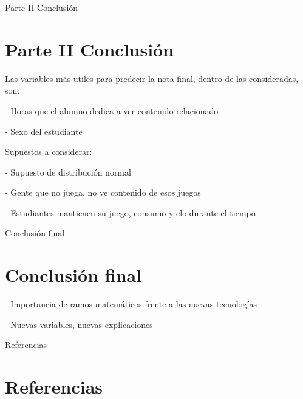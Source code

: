 \documentclass[pdf]{beamer}
\begin{document}
\begin{frame}{Parte II Conclusión}
\section{Parte II Conclusión}
\begin{footnotesize}
            
Las variables más utiles para predecir la nota final, dentro de las consideradas, son:

- Horas que el alumno dedica a ver contenido relacionado
            
- Sexo del estudiante

            
Supuestos a considerar:

- Supuesto de distribución normal

- Gente que no juega, no ve contenido de esos juegos

- Estudiantes mantienen su juego, consumo y elo durante el tiempo

            \end{footnotesize}


\end{frame}
\begin{frame}{Conclusión final}
\section{Conclusión final}

- Importancia de ramos matemáticos frente a las nuevas tecnologías

- Nuevas variables, nuevas explicaciones


\end{frame}

\begin{frame}{Referencias}
\nocite{women}
\begin{tiny}

\end{tiny}
\section{Referencias}
\end{frame}
\end{document}
